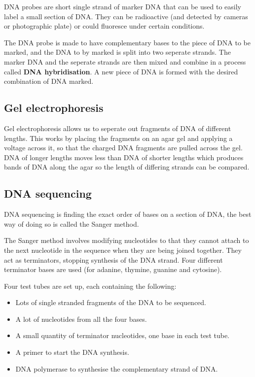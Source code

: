 \documentclass{article}
\begin{document}
DNA probes are short single strand of marker DNA that can be used to easily
label a small section of DNA. They can be radioactive (and detected by cameras
or photographic plate) or could fluoresce under certain conditions.

The DNA probe is made to have complementary bases to the piece of DNA to be
marked, and the DNA to by marked is split into two seperate strands. The marker
DNA and the seperate strands are then mixed and combine in a process called {\bf
DNA hybridisation}. A new piece of DNA is formed with the desired combination of
DNA marked.

\subsection*{Gel electrophoresis}

Gel electrophoresis allows us to seperate out fragments of DNA of different
lengths. This works by placing the fragments on an agar gel and applying a
voltage across it, so that the charged DNA fragments are pulled across the gel.
DNA of longer lengths moves less than DNA of shorter lengths which produces
bands of DNA along the agar so the length of differing strands can be compared.


\subsection*{DNA sequencing}

DNA sequencing is finding the exact order of bases on a section of DNA, the best
way of doing so is called the Sanger method.

The Sanger method involves modifying nucleotides to that they cannot attach to
the next nucleotide in the sequence when they are being joined together. They
act as terminators, stopping synthesis of the DNA strand. Four different
terminator bases are used (for adanine, thymine, guanine and cytosine).

Four test tubes are set up, each containing the following:

\begin{itemize}

	\item Lots of single stranded fragments of the DNA to be sequenced.

	\item A lot of nucleotides from all the four bases.

	\item A small quantity of terminator nucleotides, one base in each test
	tube.

	\item A primer to start the DNA synthesis.

	\item DNA polymerase to synthesise the complementary strand of DNA.

\end{itemize}
\end{document}
